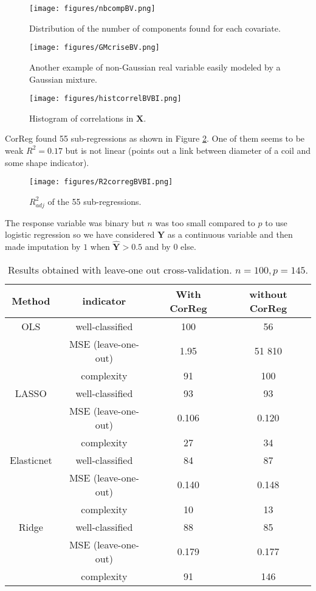 \documentclass[11pt,a4paper]{article}
\begin{document}
		
		\begin{figure}[h!]
	\begin{minipage}[t]{.30\linewidth}
			\texttt{[image: figures/nbcompBV.png]}%
			\caption{Distribution of the number of components found for each covariate.}\label{graphMixmod}
	\end{minipage} \hfill
	\begin{minipage}[t]{.30\linewidth}
			\texttt{[image: figures/GMcriseBV.png]}%
			\caption{Another example of non-Gaussian real variable easily modeled by a Gaussian mixture.}
	\end{minipage} \hfill
   \begin{minipage}[t]{.30\linewidth}
			\texttt{[image: figures/histcorrelBVBI.png]} 
			\caption{Histogram of correlations in $\boldsymbol{X}$.} \label{compareMSEexfos}
   \end{minipage}
\end{figure} 
  		
  			
CorReg found 55 sub-regressions as shown in Figure \ref{R2bv}. One of them seems to be weak $R^2=0.17$ but is not linear (points out a link between diameter of a coil and some shape indicator).	

\begin{figure}
\centering
	\texttt{[image: figures/R2corregBVBI.png]} 
			\caption{$R^2_{adj}$ of the 55 sub-regressions.}\label{R2bv}
\end{figure}
The response variable was binary but $n$ was too small compared to $p$ to use logistic regression so we have considered $\boldsymbol{Y}$ as a continuous variable and then made imputation by $1$ when $\hat{\boldsymbol{Y}}>0.5$ and by $0$ else.


\begin{table}[h!]
\centering
\begin{tabular}{|c c|c|c|}
	\hline 
	Method& indicator& With CorReg & without CorReg \\ 
	\hline
	OLS & well-classified & 100& 56 \\
		& MSE (leave-one-out)& 1.95& 51 810\\
		& complexity & 91& 100 \\
	\hline 
		LASSO & well-classified &93 &93 \\
		& MSE (leave-one-out)& 0.106 & 0.120\\
		& complexity & 27&34\\
	\hline 
		Elasticnet & well-classified &84 &87 \\
		& MSE (leave-one-out)&0.140 &0.148\\
		& complexity &10 &13\\
	\hline 
		Ridge & well-classified &88 &85 \\
		& MSE (leave-one-out)& 0.179 & 0.177\\
		& complexity &91 &146\\
	\hline 
\end{tabular} 
\caption{Results obtained with leave-one out cross-validation. $n=100, p=145$.}	
\end{table}
\end{document}
